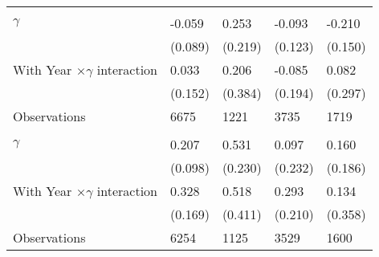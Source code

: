 {\begin{tabularx}{0.85\linewidth}{l *{4}{Y}}
\midrule
\addlinespace
{} \\
\addlinespace
$\gamma$        &   -0.059 &    0.253   &   -0.093     &   -0.210       \\
                &  (0.089)    &  (0.219)      &  (0.123)     &  (0.150)  \\
\addlinespace
  With Year $\times\gamma$ interaction   &    0.033    &   0.206    &  -0.085    &   0.082   \\
       &  (0.152)     &  (0.384)     &  (0.194)    &  (0.297)      \\
\midrule
Observations   &     6675  &     1221 &     3735  &     1719         \\

\midrule
\addlinespace
{} \\
\addlinespace
$\gamma$        &    0.207\sym{*}  &    0.531\sym{**} &    0.097    &  0.160  \\
                &  (0.098)  &  (0.230)   &  (0.232)     &  (0.186)        \\
\addlinespace
 With Year $\times\gamma$ interaction  &  0.328\sym{*} &  0.518 &  0.293  &  0.134         \\
        &  (0.169)      &  (0.411)    &  (0.210)      &  (0.358)   \\
\midrule
Observations   &     6254  &     1125 &    3529 &     1600         \\
\bottomrule

\end{tabularx}
}
